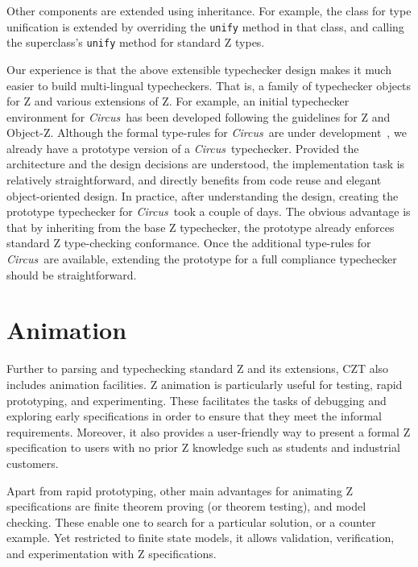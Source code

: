 \documentclass{llncs}
\newcommand{\Circus}{{\sf\slshape Circus}}
\begin{document}
Other components are extended using inheritance. For example, the
class for type unification is extended by overriding the {\tt unify}
method in that class, and calling the superclass's {\tt unify} method
for standard Z types.

Our experience is that the above extensible typechecker design makes
it much easier to build multi-lingual typecheckers.  That is, a family
of typechecker objects for Z and various extensions of Z.
%
For example, an initial typechecker environment for \Circus\ has been
developed following the guidelines for Z and Object-Z. Although the
formal type-rules for \Circus\ are under
development~\cite{circus.other:typechecker}, we already have a
prototype version of a \Circus\ typechecker.  Provided the
architecture and the design decisions are understood, the
implementation task is relatively straightforward, and directly
benefits from code reuse and elegant object-oriented design.  In
practice, after understanding the design, creating the prototype
typechecker for \Circus\ took a couple of days. The obvious advantage
is that by inheriting from the base Z typechecker, the prototype already
enforces standard Z type-checking conformance. Once the additional
type-rules for \Circus\ are available, extending the prototype for a full
compliance typechecker should be straightforward.


\section{Animation}
\label{animation}

    Further to parsing and typechecking standard Z and its extensions,
    CZT also includes animation facilities. Z animation is
    particularly useful for testing, rapid prototyping, and
    experimenting. These facilitates the tasks of debugging and
    exploring early specifications in order to ensure that they meet
    the informal requirements.  Moreover, it also provides a
    user-friendly way to present a formal Z specification to users
    with no prior Z knowledge such as students and industrial customers.

    Apart from rapid prototyping, other main advantages for
    animating Z specifications are finite theorem proving (or theorem
    testing), and model checking.  These enable one to search for a
    particular solution, or a counter example.  Yet restricted to
    finite state models, it allows validation, verification, and
    experimentation with Z specifications.
\end{document}
